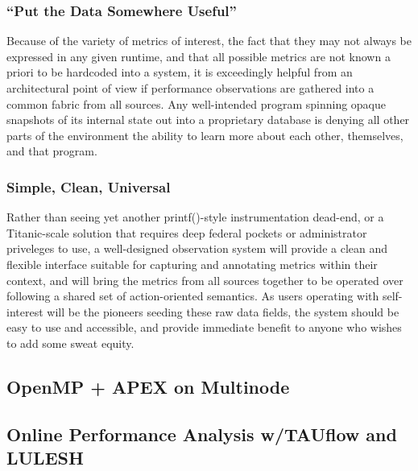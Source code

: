 \subsubsection{``Put the Data Somewhere Useful''}
Because of the variety of metrics of interest, the fact that they may
not always be expressed in any given runtime, and that all possible
metrics are not known a priori to be hardcoded into a system, it is
exceedingly helpful from an architectural point of view if performance
observations are gathered into a common fabric from all sources.
%
Any well-intended program spinning opaque snapshots of its internal
state out into a proprietary database is denying all other parts of
the environment the ability to learn more about each other,
themselves, and that program.


\subsubsection{Simple, Clean, Universal}
Rather than seeing yet another printf()-style instrumentation
dead-end, or a Titanic-scale solution that requires deep federal
pockets or administrator priveleges to use, a well-designed
observation system will provide a clean and flexible interface
suitable for capturing and annotating metrics within their context,
and will bring the metrics from all sources together to be operated
over following a shared set of action-oriented semantics.
%
As users operating with self-interest will be the pioneers seeding
these raw data fields, the system should be easy to use and
accessible, and provide immediate benefit to anyone who wishes to add
some sweat equity.






\subsection{OpenMP + APEX on Multinode}



\subsection{Online Performance Analysis w/TAUflow and LULESH}



